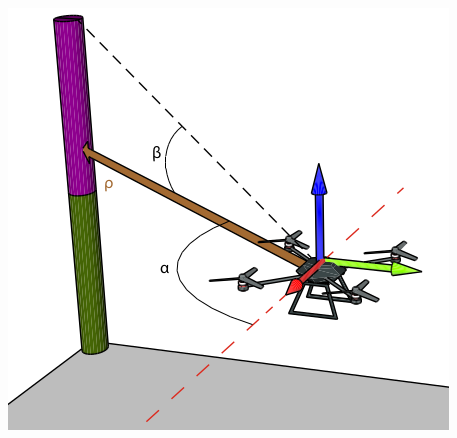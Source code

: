 \documentclass[serif,aspectratio=169]{beamer}
\begin{document}
    \begin{frame}
        \centering
        \includegraphics[height=0.8\textheight]{Images/fig28-range-and-bearing.png}
    \end{frame}
\end{document}
